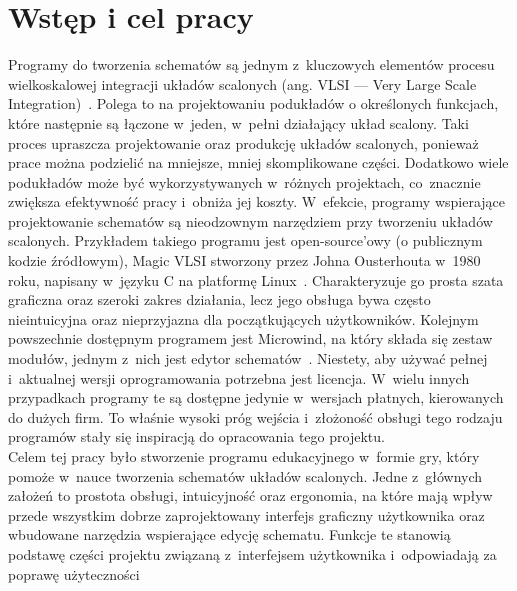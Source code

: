 \chapter{Wstęp i cel pracy}

Programy do tworzenia schematów są jednym z~kluczowych elementów
procesu wielkoskalowej integracji układów scalonych (ang. VLSI — Very Large Scale Integration)~\cite{VLSI_insemi}.
Polega to na projektowaniu podukładów o określonych funkcjach,
które następnie są łączone w~jeden, w~pełni działający układ scalony.
Taki proces upraszcza projektowanie oraz produkcję układów scalonych, ponieważ prace można podzielić na mniejsze,
mniej skomplikowane części.
Dodatkowo wiele podukładów może być wykorzystywanych w~różnych projektach,
co~znacznie zwiększa efektywność pracy i~obniża jej koszty.
W~efekcie,
programy wspierające projektowanie schematów są nieodzownym narzędziem przy tworzeniu układów scalonych.
Przykładem takiego programu jest open-source'owy (o publicznym kodzie źródłowym),
Magic VLSI stworzony przez Johna Ousterhouta w~1980 roku,
napisany w~języku C na platformę Linux~\cite{MAGIC_article}.
Charakteryzuje go prosta szata graficzna oraz szeroki zakres działania,
lecz jego obsługa bywa często nieintuicyjna oraz nieprzyjazna dla początkujących użytkowników.
Kolejnym powszechnie dostępnym programem jest Microwind,
na który składa się zestaw modułów,
jednym z~nich jest edytor schematów~\cite{Microwind}.
Niestety, aby używać pełnej i~aktualnej wersji oprogramowania potrzebna jest licencja.
W~wielu innych przypadkach programy te są dostępne jedynie w~wersjach płatnych, kierowanych do dużych firm.
To właśnie wysoki próg wejścia
i~złożoność obsługi tego rodzaju programów stały się inspiracją do opracowania tego projektu.\\
\indent Celem tej pracy było stworzenie
programu edukacyjnego w~formie gry, który pomoże w~nauce tworzenia schematów układów scalonych.
Jedne z~głównych założeń to prostota obsługi, intuicyjność oraz ergonomia,
na które mają wpływ przede wszystkim dobrze zaprojektowany interfejs graficzny użytkownika
oraz wbudowane narzędzia wspierające edycję schematu.
Funkcje te stanowią podstawę części projektu związaną z~interfejsem użytkownika
i~odpowiadają za poprawę użyteczności
